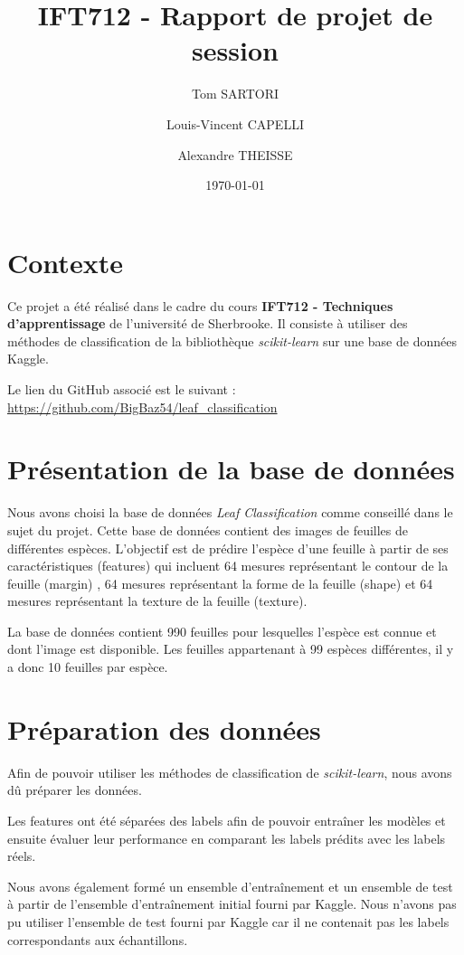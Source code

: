 \documentclass{article}
\title{IFT712 - Rapport de projet de session}
\author{Tom SARTORI \and Louis-Vincent CAPELLI \and Alexandre THEISSE}
\date{\today}
\begin{document}
\maketitle
\newpage

\tableofcontents
\newpage

\section{Contexte}
Ce projet a été réalisé dans le cadre du cours \textbf{IFT712 - Techniques d'apprentissage} de
l'université de Sherbrooke. Il consiste à utiliser des méthodes de classification
de la bibliothèque \textit{scikit-learn} sur une base de données Kaggle.

Le lien du GitHub associé est le suivant : \url{https://github.com/BigBaz54/leaf_classification}


\section{Présentation de la base de données}
Nous avons choisi la base de données \textit{Leaf Classification} \cite{leafKaggle} 
comme conseillé dans le sujet du projet. Cette base de données contient des images de feuilles
de différentes espèces. L'objectif est de prédire l'espèce d'une feuille à partir de ses
caractéristiques (features) qui incluent 64 mesures représentant le contour de la feuille (margin) 
\cite{leafMargin}, 64 mesures représentant la forme de la feuille (shape) et 64 mesures
représentant la texture de la feuille (texture). 

La base de données contient 990 feuilles pour lesquelles l'espèce est connue et dont l'image
est disponible. Les feuilles appartenant à 99 espèces différentes, il y a donc 10 feuilles
par espèce.

\section{Préparation des données}
Afin de pouvoir utiliser les méthodes de classification de \textit{scikit-learn}, nous avons
dû préparer les données. 

Les features ont été séparées des labels afin de pouvoir entraîner les modèles et
ensuite évaluer leur performance en comparant les labels prédits avec les labels réels.

Nous avons également formé un ensemble d'entraînement et un ensemble de test à partir 
de l'ensemble d'entraînement initial fourni par Kaggle. Nous n'avons pas pu utiliser
l'ensemble de test fourni par Kaggle car il ne contenait pas les labels correspondants
aux échantillons.
\end{document}
